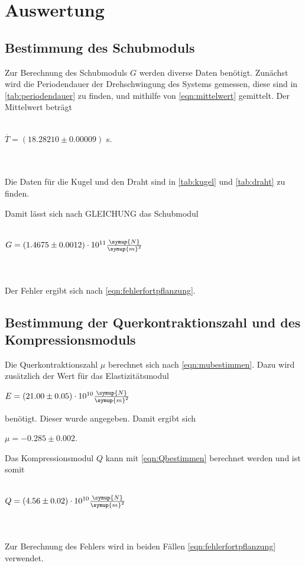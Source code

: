 \section{Auswertung}
\label{sec:Auswertung}
\subsection{Bestimmung des Schubmoduls}



Zur Berechnung des Schubmoduls $G$ werden diverse Daten benötigt. Zunächst wird die Periodendauer der Drehschwingung des Systems gemessen, diese sind in \autoref{tab:periodendauer} zu finden, und mithilfe von \eqref{eqn:mittelwert} gemittelt. Der Mittelwert beträgt
\\ \\
\centerline{$\overline{T} = (18.28210 \pm 0.00009)$ s.}
\\ \\
Die Daten für die Kugel und den Draht sind in \autoref{tab:kugel} und \autoref{tab:draht} zu finden.




Damit lässt sich nach GLEICHUNG das Schubmodul
\\ \\
\centerline{$G = (1.4675 \pm 0.0012) \cdot 10^{11} \frac{\symup{N}}{\symup{m}^2}$}
\\ \\
Der Fehler ergibt sich nach \eqref{eqn:fehlerfortpflanzung}.

\subsection{Bestimmung der Querkontraktionszahl und des Kompressionsmoduls}

Die Querkontraktionszahl $\mu$ berechnet sich nach \eqref{eqn:mubestimmen}. Dazu wird zusätzlich der Wert für das Elastizitätsmodul 

\centerline{$E = (21.00 \pm 0.05) \cdot 10^{10} \frac{\symup{N}}{\symup{m}^2}$}

benötigt. Dieser wurde angegeben. Damit ergibt sich 

\centerline{$\mu = -0.285 \pm 0.002$.}

Das Kompressionsmodul $Q$ kann mit \eqref{eqn:Qbestimmen} berechnet werden und ist somit
\\ \\
\centerline{$Q = (4.56 \pm 0.02) \cdot 10^{10} \frac{\symup{N}}{\symup{m}^2}$}
\\ \\
Zur Berechnung des Fehlers wird in beiden Fällen \eqref{eqn:fehlerfortpflanzung} verwendet.


